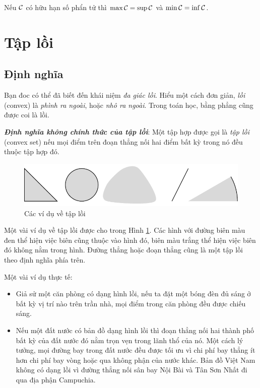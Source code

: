 Nếu $\mathcal{C}$ có hữu hạn số phẩn tử thì $\max \mathcal{C} = \sup \mathcal{C}$ và $\min \mathcal{C} = \inf \mathcal{C}$.

\section{Tập lồi}
\subsection{Định nghĩa}
Bạn đoc có thể đã biết đến khái niệm \textit{đa giác lồi}. Hiểu một cách đơn giản, \textit{lồi} (convex) là \textit{phình ra ngoài}, hoặc \textit{nhô ra ngoài}. Trong toán học,
{bằng phẳng} cũng được coi là {lồi}.

\textit{\textbf{Định nghĩa không chính thức của tập lồi}}: Một tập hợp được gọi là
\textit{tập lồi} (convex set) nếu mọi điểm trên đoạn thẳng nối hai điểm {bất kỳ} trong
nó đều thuộc tập hợp đó.


\begin{figure}[t]
\centering
\includegraphics[width = .8\textwidth]{Chapters/08_ConvexOptimization/16_convexity/latex/convexsets.pdf}
\caption[]{Các ví dụ về tập lồi}
\label{fig:16_convexsets}
\end{figure}

Một vài ví dụ về tập lồi được cho trong Hình \ref{fig:16_convexsets}. Các hình
với đường biên màu đen thể hiện việc biên cũng thuộc vào hình đó, biên màu trắng
thể hiện việc biên đó không nằm trong hình. Đường thẳng hoặc đoạn
thẳng cũng là một tập lồi theo định nghĩa phía trên.

Một vài ví dụ thực tế:

\begin{itemize}
\item Giả sử một căn phòng có dạng hình lồi, nếu ta đặt một bóng đèn đủ
sáng ở bất kỳ vị trí nào trên trần nhà, mọi điểm trong căn phòng đều được
chiếu sáng.

\item Nếu một đất nước có bản đồ dạng hình lồi thì đoạn thẳng nối hai
thành phố bất kỳ của đất nước đó nằm trọn vẹn trong lãnh thổ của nó. Một cách lý
tưởng, mọi đường bay trong đất nước đều được tối ưu vì chi phí bay thẳng ít
hơn chi phí bay vòng hoặc qua không phận của nước khác. Bản đồ Việt
Nam không có dạng lồi vì đường thẳng nối sân bay Nội Bài và Tân Sơn Nhất đi
qua địa phận Campuchia.

\end{itemize}


